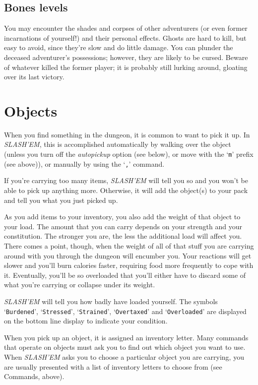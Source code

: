 \subsection*{Bones levels}


You may encounter the shades and corpses of other adventurers (or even
former incarnations of yourself!) and their personal effects.  Ghosts
are hard to kill, but easy to avoid, since they're slow and do little
damage.  You can plunder the deceased adventurer's possessions;
however, they are likely to be cursed.  Beware of whatever killed the
former player; it is probably still lurking around, gloating over its
last victory.

\section{Objects }


When you find something in the dungeon, it is common to want to pick
it up.  In {\it SLASH'EM}, this is accomplished automatically by walking over
the object (unless you turn off the
{\it autopickup\/} 
option (see below), or move with the `{\tt m}' prefix (see above)), or
manually by using the `{\tt ,}' command.

If you're carrying too many items, {\it SLASH'EM\/} will tell you so and you won't 
be able to pick
up anything more.  Otherwise, it will add the object(s) to your pack and tell
you what you just picked up.

As you add items to your inventory, you also add the weight of that object
to your load.  The amount that you can carry depends on your strength and
your constitution.  The
stronger you are, the less the additional load will affect you.  There comes
a point, though, when the weight of all of that stuff you are carrying around
with you through the dungeon will encumber you.  Your reactions
will get slower and you'll burn calories faster, requiring food more frequently
to cope with it.  Eventually, you'll be so overloaded that you'll either have
to discard some of what you're carrying or collapse under its weight.

{\it SLASH'EM\/} will tell you how badly have loaded yourself.  The symbols
`{\tt Burdened}', `{\tt Stressed}', `{\tt Strained}', `{\tt Overtaxed}' and `{\tt Overloaded}' are
displayed on the bottom line display to indicate your condition.

When you pick up an object, it is assigned an inventory letter.  Many
commands that operate on objects must ask you to find out which object
you want to use.  When {\it SLASH'EM\/} asks you to choose a particular object
you are carrying, you are usually presented with a list of inventory
letters to choose from (see Commands, above).

